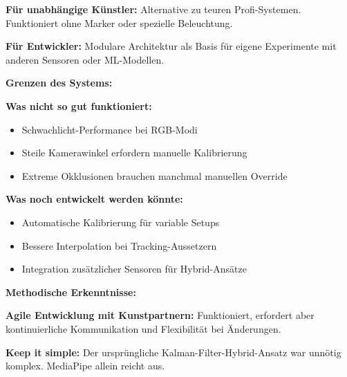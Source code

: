 \textbf{Für unabhängige Künstler:}
Alternative zu teuren Profi-Systemen. Funktioniert ohne Marker oder spezielle Beleuchtung.

\textbf{Für Entwickler:}
Modulare Architektur als Basis für eigene Experimente mit anderen Sensoren oder ML-Modellen.

\textbf{Grenzen des Systems:}

\textbf{Was nicht so gut funktioniert:}
\begin{itemize}
    \item Schwachlicht-Performance bei RGB-Modi
    \item Steile Kamerawinkel erfordern manuelle Kalibrierung
    \item Extreme Okklusionen brauchen manchmal manuellen Override
\end{itemize}

\textbf{Was noch entwickelt werden könnte:}
\begin{itemize}
    \item Automatische Kalibrierung für variable Setups
    \item Bessere Interpolation bei Tracking-Aussetzern
    \item Integration zusätzlicher Sensoren für Hybrid-Ansätze
\end{itemize}

\textbf{Methodische Erkenntnisse:}

\textbf{Agile Entwicklung mit Kunstpartnern:} Funktioniert, erfordert aber kontinuierliche Kommunikation und Flexibilität bei Änderungen.

\textbf{Keep it simple:} Der ursprüngliche Kalman-Filter-Hybrid-Ansatz war unnötig komplex. MediaPipe allein reicht aus.